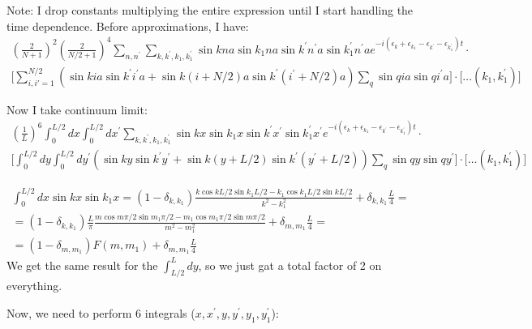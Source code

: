 \documentclass[a4paper]{article}
\begin{document}
Note: I drop constants multiplying the entire expression until I start handling the time dependence.\newline
Before approximations, I have:\newline
\begin{gather*}
(\frac{2}{N+1})^2(\frac{2}{N/2 +1})^4\sum_{n, n^\prime}\sum_{k,k^\prime,k_1,k_1^\prime}\sin{kna}\sin{k_1na}\sin{k^\prime n^\prime a}\sin{k_1^\prime n^\prime a}
e^{-i(\epsilon_k + \epsilon_{k_1} - \epsilon_{k^\prime} - \epsilon_{k_1^\prime})t} \cdot \\
\big[\sum_{i, i' = 1}^{N/2}(\sin{kia}\sin{k^\prime i^\prime a} + \sin{k(i+N/2)a}\sin{k^\prime (i^\prime + N/2) a})\sum_q \sin{qia}\sin{qi^\prime a}\big]
\cdot \big[\dots(k_1, k_1^\prime)\big]
\end{gather*}

Now I take continuum limit:
\begin{gather*}
(\frac{1}{L})^6\int_{0}^{L/2}dx\int_{0}^{L/2}dx^\prime
\sum_{k,k^\prime,k_1,k_1^\prime}\sin{kx}\sin{k_1x}\sin{k^\prime x^\prime}\sin{k_1^\prime x^\prime}
e^{-i(\epsilon_k + \epsilon_{k_1} - \epsilon_{k^\prime} - \epsilon_{k_1^\prime})t} \cdot \\
\big[\int_{0}^{L/2}dy\int_{0}^{L/2}dy^\prime(\sin{ky}\sin{k^\prime y^\prime} + \sin{k(y+L/2)}\sin{k^\prime (y^\prime + L/2)})\sum_q \sin{qy}\sin{qy^\prime }\big]
\cdot \big[\dots(k_1, k_1^\prime)\big]
\end{gather*}

\begin{gather*}
\int_{0}^{L/2}dx \sin{kx}\sin{k_1}x = (1 - \delta_{k, k_1})\frac{k\cos{kL/2}\sin{k_1L/2} - k_1\cos{k_1L/2}\sin{kL/2}}{k^2 - k_1^2} +
\delta_{k, k_1} \frac{L}{4} = \\ 
= (1 - \delta_{k, k_1})\frac{L}{\pi}\frac{m\cos{m \pi /2}\sin{m_1 \pi /2} - m_1\cos{m_1 \pi /2}\sin{m \pi /2}}{m^2 - m_1^2} +
\delta_{m, m_1} \frac{L}{4} = \\
= (1 - \delta_{m, m_1})F(m, m_1) + \delta_{m, m_1} \frac{L}{4}
\end{gather*}
We get the same result for the $\int_{L/2}^L dy$, so we just gat a total factor of 2 on everything.

Now, we need to perform 6 integrals ($x, x^\prime, y, y^\prime, y_1, y_1^\prime$): 
\end{document}
